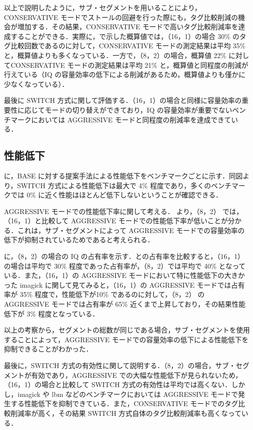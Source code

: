 以上で説明したように，サブ・セグメントを用いることにより，CONSERVATIVE モードでストールの回避を行った際にも，タグ比較削減の機会が増加する．その結果，CONSERVATIVE モードで高いタグ比較削減率を達成することができる．実際に，で示した概算値では，（16，1）の場合 30\% のタグ比較回数であるのに対して，CONSERVATIVE モードの測定結果は平均 35\% と，概算値よりも多くなっている．一方で，（8，2）の場合，概算値 22\% に対してCONSERVATIVE モードの測定結果は平均 21\% と，概算値と同程度の削減が行えている（IQ の容量効率の低下による削減があるため，概算値よりも僅かに少なくなっている）．

最後に SWITCH 方式に関して評価する．（16，1）の場合と同様に容量効率の重要性に応じてモードの切り替えができており，IQ の容量効率が重要でないベンチマークにおいては AGGRESSIVE モードと同程度の削減率を達成できている．

\subsection{性能低下}
に，BASE に対する提案手法による性能低下をベンチマークごとに示す．同図より，SWITCH 方式による性能低下は最大で 4\% 程度であり，多くのベンチマークでは 0\% に近く性能はほとんど低下しないということが確認できる．

AGGRESSIVE モードでの性能低下率に関して考える． より，（8，2） では，（16，1）と比較して AGGRESSIVE モードでの性能低下率が低いことが分かる．これは，サブ・セグメントによって AGGRESSIVE モードでの容量効率の低下が抑制されているためであると考えられる．

 に，（8，2）の場合の IQ の占有率を示す．との占有率を比較すると，（16，1）の場合は平均で 30\% 程度であった占有率が，（8，2）では平均で 40\% となっている．また，（16，1）の AGGRESSIVE モードにおいて特に性能低下の大きかった imagick に関して見てみると，（16，1）の AGGRESSIVE モードでは占有率が 35\% 程度で，性能低下が10\% であるのに対して，（8，2） の AGGRESSIVE モードでは占有率が 65\% 近くまで上昇しており，その結果性能低下が 3\% 程度となっている．

以上の考察から，セグメントの総数が同じである場合，サブ・セグメントを使用することによって，AGGRESSIVE モードでの容量効率の低下による性能低下を抑制できることがわかった．

最後に，SWITCH 方式の有効性に関して説明する．（8，2）の場合，サブ・セグメントが有効であり，AGGRESSIVE での大幅な性能低下が見られないため，（16，1）の場合と比較して SWITCH 方式の有効性は平均では高くない．しかし，imagick や lbm などのベンチマークにおいては AGGRESSIVE モードで発生する性能低下を抑制できている．また，CONSERVATIVE モードでのタグ比較削減率が高く，その結果 SWITCH 方式自体のタグ比較削減率も高くなっている．

